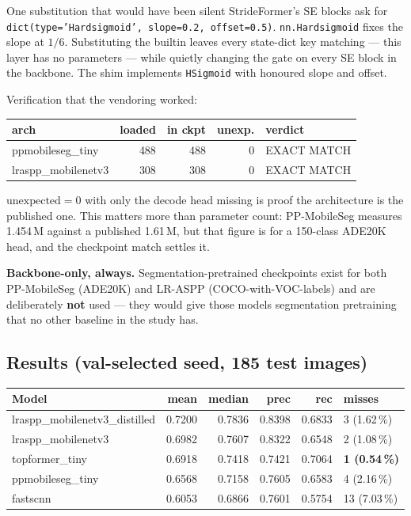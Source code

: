 \documentclass[11pt]{article}
\begin{document}
\begin{warnbox}{One substitution that would have been silent}
StrideFormer's SE blocks ask for
\texttt{dict(type='Hardsigmoid', slope=0.2, offset=0.5)}.
\texttt{nn.Hardsigmoid} fixes the slope at $1/6$. Substituting the builtin leaves
every state-dict key matching --- this layer has no parameters --- while quietly
changing the gate on every SE block in the backbone. The shim implements
\texttt{HSigmoid} with honoured slope and offset.
\end{warnbox}

Verification that the vendoring worked:

\begin{center}
\begin{tabular}{Lnnnl}
\toprule
\textbf{arch} & \textbf{loaded} & \textbf{in ckpt} & \textbf{unexp.} & \textbf{verdict} \\
\midrule
ppmobileseg\_tiny & 488 & 488 & 0 & EXACT MATCH \\
lraspp\_mobilenetv3 & 308 & 308 & 0 & EXACT MATCH \\
\bottomrule
\end{tabular}
\end{center}

$\text{unexpected}=0$ with only the decode head missing is proof the architecture
is the published one. This matters more than parameter count: PP-MobileSeg
measures 1.454\,M against a published 1.61\,M, but that figure is for a 150-class
ADE20K head, and the checkpoint match settles it.

\textbf{Backbone-only, always.} Segmentation-pretrained checkpoints exist for
both PP-MobileSeg (ADE20K) and LR-ASPP (COCO-with-VOC-labels) and are
deliberately \textbf{not} used --- they would give those models segmentation
pretraining that no other baseline in the study has.

\subsection{Results (val-selected seed, 185 test images)}

\begin{center}
\begin{tabular}{LnnnnM}
\toprule
\textbf{Model} & \textbf{mean} & \textbf{median} & \textbf{prec} & \textbf{rec} & \textbf{misses} \\
\midrule
lraspp\_mobilenetv3\_distilled & 0.7200 & 0.7836 & 0.8398 & 0.6833 & 3 (1.62\,\%) \\
lraspp\_mobilenetv3 & 0.6982 & 0.7607 & 0.8322 & 0.6548 & 2 (1.08\,\%) \\
topformer\_tiny & 0.6918 & 0.7418 & 0.7421 & 0.7064 & \textbf{1 (0.54\,\%)} \\
ppmobileseg\_tiny & 0.6568 & 0.7158 & 0.7605 & 0.6583 & 4 (2.16\,\%) \\
fastscnn & 0.6053 & 0.6866 & 0.7601 & 0.5754 & 13 (7.03\,\%) \\
\bottomrule
\end{tabular}
\end{center}
\end{document}
